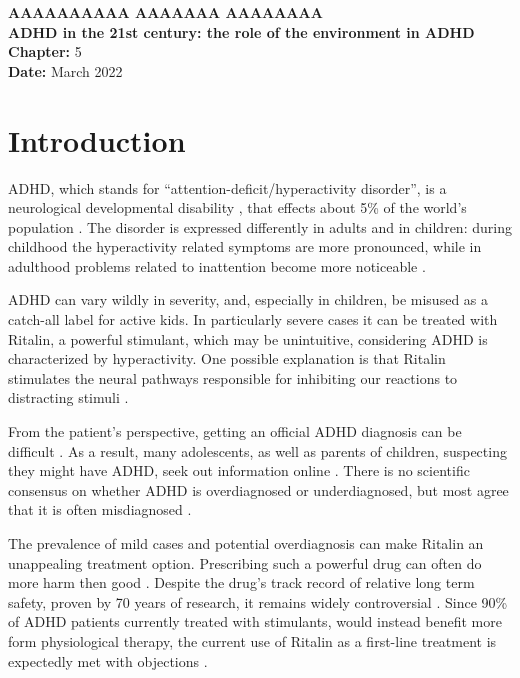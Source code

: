 \documentclass[a4paper,11pt]{article}
\begin{document}
  \begin{singlespace}
    \large
    {\bf AAAAAAAAAA AAAAAAA AAAAAAAA} \\[12pt]
    {\huge\bf ADHD in the 21st century: the role of the environment in ADHD} \\[6pt]
    \textbf{Chapter:} 5 \\
    \textbf{Date:} March 2022
  \end{singlespace}
  \vspace{-\parskip}

  \section{Introduction}
  ADHD, which stands for ``attention-deficit/hyperactivity disorder'',
  is a neurological developmental disability \cite{adolescents},
  that effects about 5\% of the world's population \cite{underdiagnosis}.
  The disorder is expressed differently in adults and in children:
  during childhood the hyperactivity related symptoms are more pronounced,
  while in adulthood problems related to inattention become more noticeable \cite{underdiagnosis}.

  ADHD can vary wildly in severity, and, especially in children, be misused as a catch-all label for active kids.
  In particularly severe cases it can be treated with Ritalin, a powerful stimulant,
  which may be unintuitive, considering ADHD is characterized by hyperactivity.
  One possible explanation is that Ritalin stimulates the neural pathways responsible for
  inhibiting our reactions to distracting stimuli \cite{thebook}.

  From the patient's perspective, getting an official ADHD diagnosis can be difficult \cite{diagnosisdifficulty}.
  As a result, many adolescents, as well as parents of children, suspecting they might have ADHD,
  seek out information online \cite{informationseeking}.
  There is no scientific consensus on whether ADHD is overdiagnosed or underdiagnosed,
  but most agree that it is often misdiagnosed \cite{overorunderdiagnosed}.

  The prevalence of mild cases and potential overdiagnosis can make Ritalin an unappealing treatment option.
  Prescribing such a powerful drug can often do more harm then good \cite{thebook}.
  Despite the drug's track record of relative long term safety, proven by 70 years of research,
  it remains widely controversial \cite{controversy}.
  Since 90\% of ADHD patients currently treated with stimulants,
  would instead benefit more form physiological therapy,
  the current use of Ritalin as a first-line treatment is expectedly met with objections \cite{controversy}.
\end{document}
